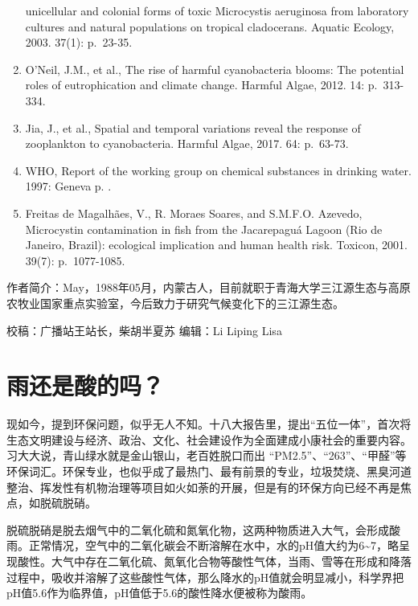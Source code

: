 \documentclass[]{book}
\begin{document}
\begin{enumerate}
  unicellular and colonial forms of toxic Microcystis aeruginosa from
  laboratory cultures and natural populations on tropical cladocerans.
  Aquatic Ecology, 2003. 37(1): p.~23-35.
\item
  O'Neil, J.M., et al., The rise of harmful cyanobacteria blooms: The
  potential roles of eutrophication and climate change. Harmful Algae,
  2012. 14: p.~313-334.
\item
  Jia, J., et al., Spatial and temporal variations reveal the response
  of zooplankton to cyanobacteria. Harmful Algae, 2017. 64: p.~63-73.
\item
  WHO, Report of the working group on chemical substances in drinking
  water. 1997: Geneva p. .
\item
  Freitas de Magalhães, V., R. Moraes Soares, and S.M.F.O. Azevedo,
  Microcystin contamination in fish from the Jacarepaguá Lagoon (Rio de
  Janeiro, Brazil): ecological implication and human health risk.
  Toxicon, 2001. 39(7): p.~1077-1085.
\end{enumerate}

作者简介：May，1988年05月，内蒙古人，目前就职于青海大学三江源生态与高原农牧业国家重点实验室，今后致力于研究气候变化下的三江源生态。

校稿：广播站王站长，柴胡半夏苏 编辑：Li Liping Lisa

\section{雨还是酸的吗？}

现如今，提到环保问题，似乎无人不知。十八大报告里，提出``五位一体''，首次将生态文明建设与经济、政治、文化、社会建设作为全面建成小康社会的重要内容。习大大说，青山绿水就是金山银山，老百姓脱口而出
``PM2.5''、``263''、``甲醛''等环保词汇。环保专业，也似乎成了最热门、最有前景的专业，垃圾焚烧、黑臭河道整治、挥发性有机物治理等项目如火如荼的开展，但是有的环保方向已经不再是焦点，如脱硫脱硝。

脱硫脱硝是脱去烟气中的二氧化硫和氮氧化物，这两种物质进入大气，会形成酸雨。正常情况，空气中的二氧化碳会不断溶解在水中，水的pH值大约为6\textasciitilde{}7，略呈现酸性。大气中存在二氧化硫、氮氧化合物等酸性气体，当雨、雪等在形成和降落过程中，吸收并溶解了这些酸性气体，那么降水的pH值就会明显减小，科学界把pH值5.6作为临界值，pH值低于5.6的酸性降水便被称为酸雨。
\end{document}
